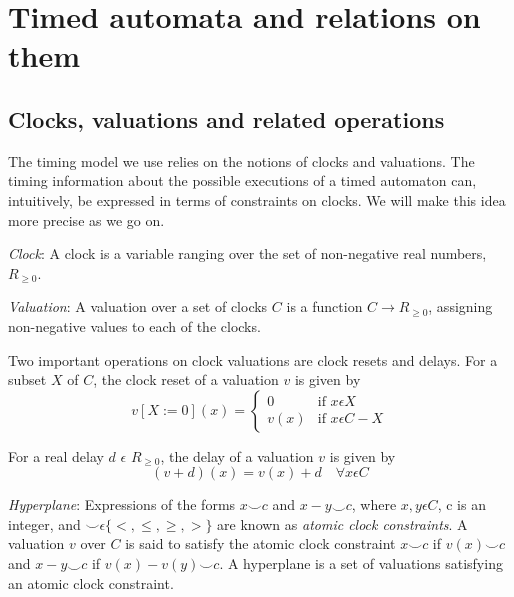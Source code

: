 \chapter{Timed automata and relations on them}

\section{Clocks, valuations and related operations}

The timing model we use relies on the notions of clocks and
valuations. The timing information about the possible executions of a
timed automaton can, intuitively, be expressed in terms of constraints
on clocks. We will make this idea more precise as we go on.

\begin{definition}
\emph{Clock}: A clock is a variable ranging over the set of
non-negative real numbers, $R_{\geq 0}$.
\end{definition}

\begin{definition}
\emph{Valuation}: A valuation over a set of clocks $C$ is a
function $C \rightarrow R_{\geq 0}$, assigning non-negative values
to each of the clocks.
\end{definition}

Two important operations on clock valuations are clock resets and
delays. For a subset $X$ of $C$, the clock reset of a valuation $v$
is given by
\begin{displaymath}
  v[X:=0](x) = 
  \begin{cases}
    0    & \text{if } x \epsilon X \\
    v(x) & \text{if } x \epsilon C - X
  \end{cases}
\end{displaymath}

For a real delay $d$ $\epsilon$ $R_{\geq 0}$, the delay of a valuation
$v$ is given by
\begin{displaymath}
  (v + d)(x) = v(x) + d \quad \forall x \epsilon C
\end{displaymath}

\begin{definition}
\emph{Hyperplane}: Expressions of the forms $x \smile c$ and $x - y
\smile c$, where $x, y \epsilon C$, c is an integer, and $\smile
\epsilon \{ <, \leq, \geq, >\}$ are known as \emph{atomic clock
  constraints}. A valuation $v$ over $C$ is said to satisfy the
atomic clock constraint $x \smile c$ if $v(x) \smile c$ and $x - y
\smile c$ if $v(x) - v(y) \smile c$. A hyperplane is a set of
valuations satisfying an atomic clock constraint.
\end{definition}

